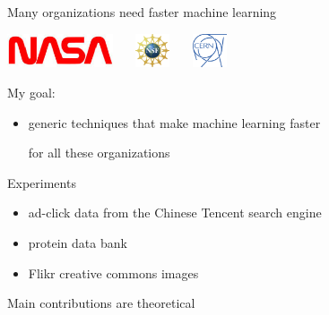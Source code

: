 \begin{frame}{Many organizations need faster machine learning}
\begin{itemize}
\vspace{0.05in}
\includegraphics[height=1cm]{img-presentation/nasa}~~~
\includegraphics[height=1cm]{img-presentation/nsf}~~~
\includegraphics[height=1cm]{img-presentation/cern}

\end{itemize}

\end{frame}


\begin{frame}{}
    My goal:
\begin{itemize}
\item
generic techniques that make machine learning faster 

for all these organizations
\end{itemize}

\vspace{0.15in}
Experiments
\begin{itemize}
\item
ad-click data from the Chinese Tencent search engine

\item
protein data bank

\item
Flikr creative commons images
\end{itemize}

\vspace{0.15in}
Main contributions are theoretical
\end{frame}
